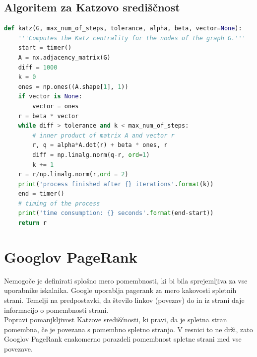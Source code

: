 \documentclass[a4paper]{article}
\begin{document}
\subsection{Algoritem za Katzovo središčnost}
\begin{lstlisting}[language=Python]
def katz(G, max_num_of_steps, tolerance, alpha, beta, vector=None):
    '''Computes the Katz centrality for the nodes of the graph G.'''
    start = timer()
    A = nx.adjacency_matrix(G)
    diff = 1000
    k = 0
    ones = np.ones((A.shape[1], 1))
    if vector is None:
        vector = ones
    r = beta * vector
    while diff > tolerance and k < max_num_of_steps:
        # inner product of matrix A and vector r
        r, q = alpha*A.dot(r) + beta * ones, r
        diff = np.linalg.norm(q-r, ord=1)
        k += 1
    r = r/np.linalg.norm(r,ord = 2)
    print('process finished after {} iterations'.format(k))
    end = timer()
    # timing of the process
    print('time consumption: {} seconds'.format(end-start))
    return r
\end{lstlisting}


\section{Googlov PageRank}
\hspace{4.8mm}Nemogoče je definirati splošno mero pomembnosti, ki bi bila sprejemljiva za vse uporabnike iskalnika. Google uporablja pagerank za mero kakovosti spletnih strani. Temelji na predpostavki, da število linkov (povezav) do in iz strani daje informacijo o pomembnosti strani. \\
Popravi pomanjkljivost Katzove središčnosti, ki pravi, da je spletna stran pomembna, če je povezana s pomembno spletno stranjo. V resnici to ne drži, zato Googlov PageRank enakomerno porazdeli pomembnost spletne strani med vse povezave.
\end{document}
